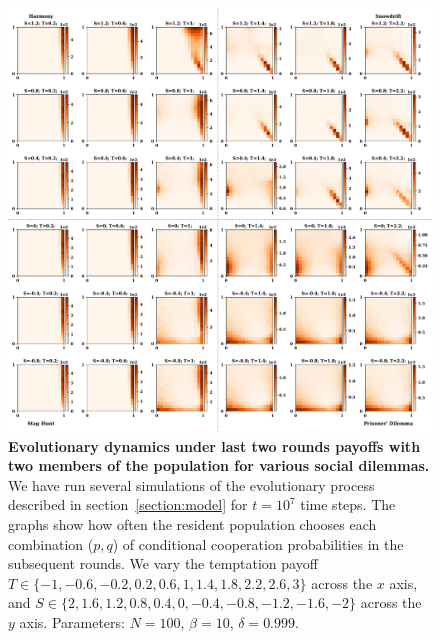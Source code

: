 \documentclass[11pt]{article}
\theoremstyle{plainCl1}
\theoremstyle{plainCl2}
\begin{document}
\begin{figure}[!htbp]
  \centering
  \includegraphics[width=\textwidth]{static/merged_plot_rounds_opponents_two.pdf}
  \caption{{\bf Evolutionary dynamics under last two rounds payoffs with two members of the population for various social dilemmas.} 
  We have run several simulations of the evolutionary process described in
  section~\ref{section:model} for $t\!=\!10^7$ time steps. The graphs show how
  often the resident population chooses each combination ($p,q$) of conditional
  cooperation probabilities in the subsequent rounds. We vary the temptation
  payoff \(T \in \{-1, -0.6, -0.2,  0.2, 0.6, 1, 1.4, 1.8, 2.2, 2.6, 3\}\)
  across the \(x\) axis, and  \(S \in \{2, 1.6, 1.2, 0.8, 0.4, 0, -0.4, -0.8,
  -1.2, -1.6, -2\}\) across the \(y\) axis. Parameters: $N\!=\!100$,
  $\beta\!=\!10$, $\delta\!=\!0.999$.}
  \label{fig:last_two_rounds_two_opponents}
\end{figure}



\end{document}
